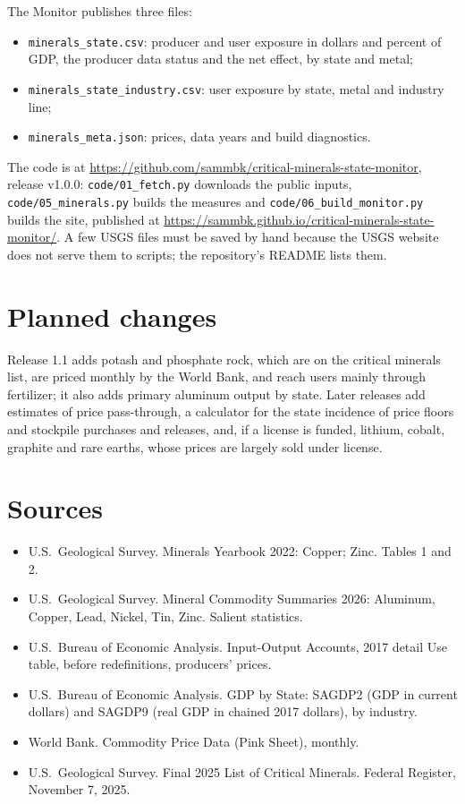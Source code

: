 \documentclass[11pt]{article}
\begin{document}
The Monitor publishes three files:
\begin{itemize}
  \item \texttt{minerals\_state.csv}: producer and user exposure in dollars and percent of
    GDP, the producer data status and the net effect, by state and metal;
  \item \texttt{minerals\_state\_industry.csv}: user exposure by state, metal and industry
    line;
  \item \texttt{minerals\_meta.json}: prices, data years and build diagnostics.
\end{itemize}
The code is at \url{https://github.com/sammbk/critical-minerals-state-monitor}, release v1.0.0:
\texttt{code/01\_fetch.py} downloads the public inputs, \texttt{code/05\_minerals.py} builds
the measures and \texttt{code/06\_build\_monitor.py} builds the site, published at
\url{https://sammbk.github.io/critical-minerals-state-monitor/}. A few USGS files must be
saved by hand because the USGS website does not serve them to scripts; the repository's
README lists them.

\section{Planned changes}

Release 1.1 adds potash and phosphate rock, which are on the critical minerals list, are
priced monthly by the World Bank, and reach users mainly through fertilizer; it also adds
primary aluminum output by state. Later releases add estimates of price pass-through, a
calculator for the state incidence of price floors and stockpile purchases and releases,
and, if a license is funded, lithium, cobalt, graphite and rare earths, whose prices are
largely sold under license.

\section*{Sources}

\begin{itemize}[leftmargin=1.2em]
  \item U.S.\ Geological Survey. Minerals Yearbook 2022: Copper; Zinc. Tables 1 and 2.
  \item U.S.\ Geological Survey. Mineral Commodity Summaries 2026: Aluminum, Copper, Lead,
    Nickel, Tin, Zinc. Salient statistics.
  \item U.S.\ Bureau of Economic Analysis. Input-Output Accounts, 2017 detail Use table,
    before redefinitions, producers' prices.
  \item U.S.\ Bureau of Economic Analysis. GDP by State: SAGDP2 (GDP in current dollars) and
    SAGDP9 (real GDP in chained 2017 dollars), by industry.
  \item World Bank. Commodity Price Data (Pink Sheet), monthly.
  \item U.S.\ Geological Survey. Final 2025 List of Critical Minerals. Federal Register,
    November 7, 2025.
\end{itemize}
\end{document}
